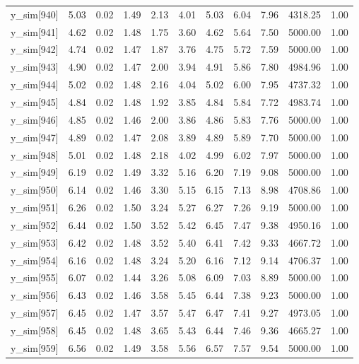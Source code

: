 \begin{table}[ht]
\begin{tabular}{rrrrrrrrrrr}
  y\_sim[940] & 5.03 & 0.02 & 1.49 & 2.13 & 4.01 & 5.03 & 6.04 & 7.96 & 4318.25 & 1.00 \\ 
  y\_sim[941] & 4.62 & 0.02 & 1.48 & 1.75 & 3.60 & 4.62 & 5.64 & 7.50 & 5000.00 & 1.00 \\ 
  y\_sim[942] & 4.74 & 0.02 & 1.47 & 1.87 & 3.76 & 4.75 & 5.72 & 7.59 & 5000.00 & 1.00 \\ 
  y\_sim[943] & 4.90 & 0.02 & 1.47 & 2.00 & 3.94 & 4.91 & 5.86 & 7.80 & 4984.96 & 1.00 \\ 
  y\_sim[944] & 5.02 & 0.02 & 1.48 & 2.16 & 4.04 & 5.02 & 6.00 & 7.95 & 4737.32 & 1.00 \\ 
  y\_sim[945] & 4.84 & 0.02 & 1.48 & 1.92 & 3.85 & 4.84 & 5.84 & 7.72 & 4983.74 & 1.00 \\ 
  y\_sim[946] & 4.85 & 0.02 & 1.46 & 2.00 & 3.86 & 4.86 & 5.83 & 7.76 & 5000.00 & 1.00 \\ 
  y\_sim[947] & 4.89 & 0.02 & 1.47 & 2.08 & 3.89 & 4.89 & 5.89 & 7.70 & 5000.00 & 1.00 \\ 
  y\_sim[948] & 5.01 & 0.02 & 1.48 & 2.18 & 4.02 & 4.99 & 6.02 & 7.97 & 5000.00 & 1.00 \\ 
  y\_sim[949] & 6.19 & 0.02 & 1.49 & 3.32 & 5.16 & 6.20 & 7.19 & 9.08 & 5000.00 & 1.00 \\ 
  y\_sim[950] & 6.14 & 0.02 & 1.46 & 3.30 & 5.15 & 6.15 & 7.13 & 8.98 & 4708.86 & 1.00 \\ 
  y\_sim[951] & 6.26 & 0.02 & 1.50 & 3.24 & 5.27 & 6.27 & 7.26 & 9.19 & 5000.00 & 1.00 \\ 
  y\_sim[952] & 6.44 & 0.02 & 1.50 & 3.52 & 5.42 & 6.45 & 7.47 & 9.38 & 4950.16 & 1.00 \\ 
  y\_sim[953] & 6.42 & 0.02 & 1.48 & 3.52 & 5.40 & 6.41 & 7.42 & 9.33 & 4667.72 & 1.00 \\ 
  y\_sim[954] & 6.16 & 0.02 & 1.48 & 3.24 & 5.20 & 6.16 & 7.12 & 9.14 & 4706.37 & 1.00 \\ 
  y\_sim[955] & 6.07 & 0.02 & 1.44 & 3.26 & 5.08 & 6.09 & 7.03 & 8.89 & 5000.00 & 1.00 \\ 
  y\_sim[956] & 6.43 & 0.02 & 1.46 & 3.58 & 5.45 & 6.44 & 7.38 & 9.23 & 5000.00 & 1.00 \\ 
  y\_sim[957] & 6.45 & 0.02 & 1.47 & 3.57 & 5.47 & 6.47 & 7.41 & 9.27 & 4973.05 & 1.00 \\ 
  y\_sim[958] & 6.45 & 0.02 & 1.48 & 3.65 & 5.43 & 6.44 & 7.46 & 9.36 & 4665.27 & 1.00 \\ 
  y\_sim[959] & 6.56 & 0.02 & 1.49 & 3.58 & 5.56 & 6.57 & 7.57 & 9.54 & 5000.00 & 1.00 \\ 

\end{tabular}
\end{table}
